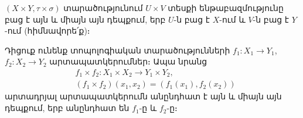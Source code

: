 \documentclass[./main.tex]{subfiles}
\begin{document}
\begin{hetevanq1_sa}\label{ch13cor1}
$(X \times Y, \tau\times \sigma)$ տարածությունում $U\times V$ տեսքի ենթա\-բազ\-մությունը բաց է այն և միայն այն դեպքում, երբ $U$-ն բաց է $X$-ում և $V$-ն բաց է $Y$-ում (հիմնավորե՛ք)։
\end{hetevanq1_sa}
\begin{theorem}\label{ch13thm2}
Դիցուք ունենք տոպոլոգիական տարածությունների $f_1:X_1\rightarrow Y_1$, \linebreak $f_2:X_2\rightarrow Y_2$ արտապատկերումներ։ Ապա նրանց
\densequation
\begin{align*}
&f_1\times f_2:X_1\times X_2\rightarrow Y_1\times Y_2,\\
&(f_1\times f_2)(x_1,x_2)=(f_1 (x_1),f_2 (x_2))
\end{align*}
արտադրյալ արտապատկերումն անընդհատ է այն և միայն այն դեպքում, երբ ան\-ընդ\-հատ են $f_1$-ը և $f_2$-ը։
\end{theorem}
\end{document}
